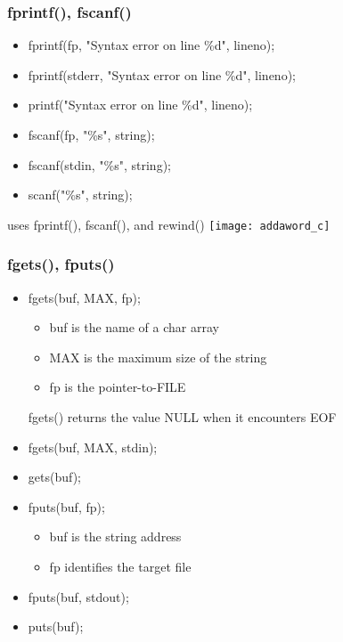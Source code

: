 \documentclass[hyperref={xetex,colorlinks,linkcolor=blue},green,compress]{beamer}
\begin{document}
\begin{frame}\frametitle{fprintf(), fscanf()}
  \begin{itemize}
  \item fprintf(fp, "Syntax error on line \%d", lineno);
  \item fprintf(stderr, "Syntax error on line \%d", lineno);
  \item printf("Syntax error on line \%d", lineno);
  \item fscanf(fp, "\%s", string);
  \item fscanf(stdin, "\%s", string);
  \item scanf("\%s", string);
  \end{itemize}
\end{frame}

\begin{frame}
  \begin{exampleblock}{uses fprintf(), fscanf(), and rewind()}
    \texttt{[image: addaword\_c]}    
  \end{exampleblock}
\end{frame}

\begin{frame}\frametitle{fgets(), fputs()}
  \begin{exampleblock}{}
    \begin{itemize}
    \item fgets(buf, MAX, fp);
      \begin{itemize}
      \item \alert{buf} is the name of a char array
      \item \alert{MAX} is the maximum size of the string
      \item \alert{fp} is the pointer-to-FILE
      \end{itemize}
      fgets() returns the value NULL when it encounters EOF
    \item fgets(buf, MAX, stdin);
    \item gets(buf);
    \end{itemize}
  \end{exampleblock}
  \begin{exampleblock}{}
    \begin{itemize}      
    \item fputs(buf, fp);
      \begin{itemize}
      \item \alert{buf} is the string address
      \item \alert{fp} identifies the target file
      \end{itemize}
    \item fputs(buf, stdout);
    \item puts(buf);
    \end{itemize}
  \end{exampleblock}
\end{frame}
\end{document}
